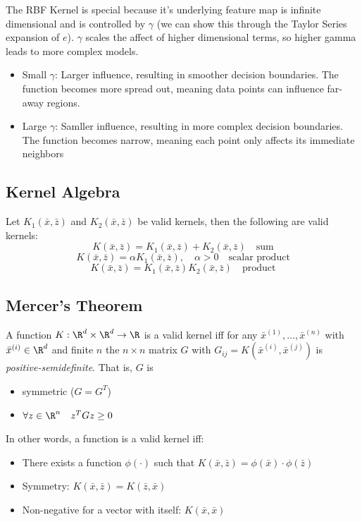 \documentclass[12pt]{article}
\begin{document}
The RBF Kernel is special because it's underlying feature map is infinite dimensional and is controlled by $\gamma$ (we can show this through the Taylor Series expansion of $e$). $\gamma$ scales the affect of higher dimensional terms, so higher gamma leads to more complex models.

\begin{itemize}
	\item Small $\gamma$: Larger influence, resulting in smoother decision boundaries. The function becomes more spread out, meaning data points can influence far-away regions.
	\item Large $\gamma$: Samller influence, resulting in more complex decision boundaries. The function becomes narrow, meaning each point only affects its immediate neighbors
\end{itemize}

\subsection{Kernel Algebra}

Let $K_1(\bar x, \bar z)$ and $K_2(\bar x, \bar z)$ be valid kernels, then the following are valid kernels:
\[ K (\bar x, \bar z) = K_1(\bar x, \bar z) + K_2(\bar x, \bar z) \quad \text{sum}\]
\[ K (\bar x, \bar z) = \alpha K_1(\bar x, \bar z), \quad \alpha > 0 \quad \text{scalar product}\]
\[ K (\bar x, \bar z) = K_1(\bar x, \bar z) K_2(\bar x, \bar z) \quad \text{product}\]

\subsection{Mercer's Theorem}

A function $K: \R^d \times \R^d \rightarrow \R$ is a valid kernel iff for any $\bar{x}^{(1)}, \dots, \bar{x}^{(n)}$ with $\bar{x}^{(i)} \in \R^d$ and finite $n$ the $n \times n$ matrix $G$ with $G_{ij} = K(\bar{x}^{(i)}, \bar{x}^{(j)})$ is \emph{positive-semidefinite}. That is, $G$ is

\begin{itemize}
	\item symmetric ($G = G^T$)
	\item $\forall z \in \R^n \quad z^TGz \ge 0$
\end{itemize}

In other words, a function is a valid kernel iff:

\begin{itemize}
	\item There exists a function $\phi(\cdot)$ such that $K(\bar x, \bar z) = \phi(\bar x) \cdot \phi(\bar z)$
	\item Symmetry: $K(\bar x, \bar z) = K(\bar z, \bar x)$
	\item Non-negative for a vector with itself: $K(\bar x, \bar x)$
\end{itemize}
\end{document}

